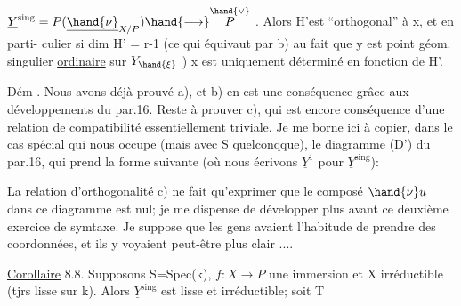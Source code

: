
$\underline{Y}^{\mathrm{sing}} = P(\underline{\hand{\nu}}_{X/P}) \hand{\longrightarrow} \overset{\hand{\vee}}{P}$ . Alors H'est ``orthogonal'' à x, et en parti-%
culier si dim H' = r-1 (ce qui équivaut par b) au fait que 
y est point géom. singulier \uline{ordinaire} sur $Y_{\hand{\xi}}$ ) x est uniquement déterminé
en fonction de H'.

Dém . Nous avons déjà prouvé a), et b) en est une conséquence
grâce aux développements du par.16. Reste à prouver c), qui est
encore conséquence d'une relation de compatibilité essentiellement
triviale. Je me borne ici à copier, dans le cas spécial qui nous
occupe (mais avec S quelconqque), le diagramme (D') du par.16, qui
prend la forme suivante (où nous écrivons $\underline{Y}^1$ pour $\underline{Y}^{\mathrm{sing}}$):


La relation d'orthogonalité c) ne fait qu'exprimer que le composé
$\hand{\nu}u$ dans ce diagramme est nul; je me dispense de développer plus
avant ce deuxième exercice de symtaxe. Je suppose que les gens avaient
l'habitude de prendre des coordonnées, et ils y voyaient peut-être plus
clair ....

\uline{Corollaire} 8.8. Supposons S=Spec(k),  $f : X \to P$ une immersion et X
irréductible (tjrs lisse sur k).  Alors $\underline{Y}^{\mathrm{sing}}$ est lisse et irréductible; soit T

